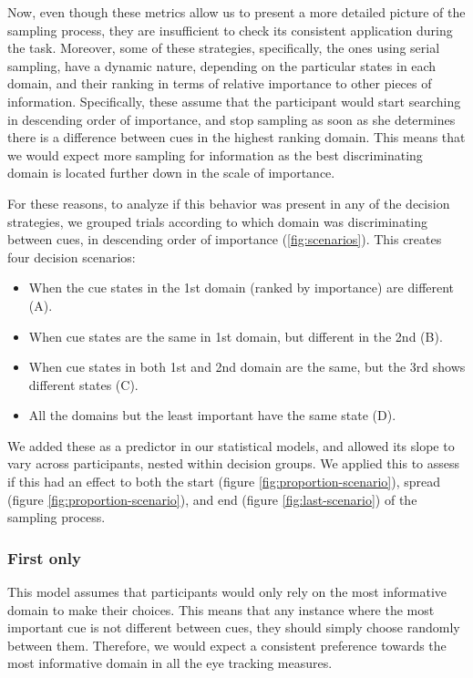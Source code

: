 \documentclass[
  english,
  man]{apa6}
\providecommand{\tightlist}{%
  \setlength{\itemsep}{0pt}\setlength{\parskip}{0pt}}
\begin{document}
Now, even though these metrics allow us to present a more detailed picture of the sampling process, they are insufficient to check its consistent application during the task. Moreover, some of these strategies, specifically, the ones using serial sampling, have a dynamic nature, depending on the particular states in each domain, and their ranking in terms of relative importance to other pieces of information. Specifically, these assume that the participant would start searching in descending order of importance, and stop sampling as soon as she determines there is a difference between cues in the highest ranking domain. This means that we would expect more sampling for information as the best discriminating domain is located further down in the scale of importance.

For these reasons, to analyze if this behavior was present in any of the decision strategies, we grouped trials according to which domain was discriminating between cues, in descending order of importance (\ref{fig:scenarios}). This creates four decision scenarios:

\begin{itemize}
\tightlist
\item
  When the cue states in the 1st domain (ranked by importance) are different (A).
\item
  When cue states are the same in 1st domain, but different in the 2nd (B).
\item
  When cue states in both 1st and 2nd domain are the same, but the 3rd shows different states (C).
\item
  All the domains but the least important have the same state (D).
\end{itemize}

We added these as a predictor in our statistical models, and allowed its slope to vary across participants, nested within decision groups. We applied this to assess if this had an effect to both the start (figure \ref{fig:proportion-scenario}), spread (figure \ref{fig:proportion-scenario}), and end (figure \ref{fig:last-scenario}) of the sampling process.

\hypertarget{first-only}{%
\subsubsection{First only}\label{first-only}}

This model assumes that participants would only rely on the most informative domain to make their choices. This means that any instance where the most important cue is not different between cues, they should simply choose randomly between them. Therefore, we would expect a consistent preference towards the most informative domain in all the eye tracking measures.
\end{document}
